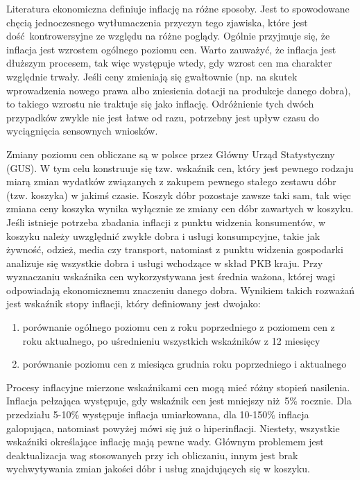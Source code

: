 \documentclass[12pt]{extarticle}
\begin{document}
Literatura ekonomiczna definiuje inflację na różne sposoby. Jest to spowodowane chęcią jednoczesnego wytłumaczenia przyczyn tego zjawiska, które jest dość kontrowersyjne ze względu na różne poglądy. Ogólnie przyjmuje się, że inflacja jest wzrostem ogólnego poziomu cen. Warto zauważyć, że inflacja jest dłuższym procesem, tak więc występuje wtedy, gdy wzrost cen ma charakter względnie trwały. Jeśli ceny zmieniają się gwałtownie (np. na skutek wprowadzenia nowego prawa albo zniesienia dotacji na produkcje danego dobra), to takiego wzrostu nie traktuje się jako inflację. Odróżnienie tych dwóch przypadków zwykle nie jest łatwe od razu, potrzebny jest upływ czasu do wyciągnięcia sensownych wniosków.

Zmiany poziomu cen obliczane są w polsce przez Główny Urząd Statystyczny (GUS). W tym celu konstruuje się tzw. wskaźnik cen, który jest pewnego rodzaju miarą zmian wydatków związanych z zakupem pewnego stałego zestawu dóbr (tzw. koszyka) w jakimś czasie. Koszyk dóbr pozostaje zawsze taki sam, tak więc zmiana ceny koszyka wynika wyłącznie ze zmiany cen dóbr zawartych w koszyku. Jeśli istnieje potrzeba zbadania inflacji z punktu widzenia konsumentów, w koszyku należy uwzględnić zwykłe dobra i usługi konsumpcyjne, takie jak żywność, odzież, media czy transport, natomiast z punktu widzenia gospodarki analizuje się wszystkie dobra i usługi wchodzące w skład PKB kraju. Przy wyznaczaniu wskaźnika cen wykorzystywana jest średnia ważona, której wagi odpowiadają ekonomicznemu znaczeniu danego dobra. Wynikiem takich rozważań jest wskaźnik stopy inflacji, który definiowany jest dwojako: 

\begin{enumerate}
	\item porównanie ogólnego poziomu cen z roku poprzedniego z poziomem cen z roku aktualnego, po uśrednieniu wszystkich wskaźników z 12 miesięcy
    \item porównanie poziomu cen z miesiąca grudnia roku poprzedniego i aktualnego
\end{enumerate}

Procesy inflacyjne mierzone wskaźnikami cen mogą mieć różny stopień nasilenia. Inflacja pełzająca występuje, gdy wskaźnik cen jest mniejszy niż 5\% rocznie. Dla przedziału 5-10\% występuje inflacja umiarkowana, dla 10-150\% inflacja galopująca, natomiast powyżej mówi się już o hiperinflacji. Niestety, wszystkie wskaźniki określające inflację mają pewne wady. Głównym problemem jest deaktualizacja wag stosowanych przy ich obliczaniu, innym jest brak wychwytywania zmian jakości dóbr i usług znajdujących się w koszyku.
\end{document}
